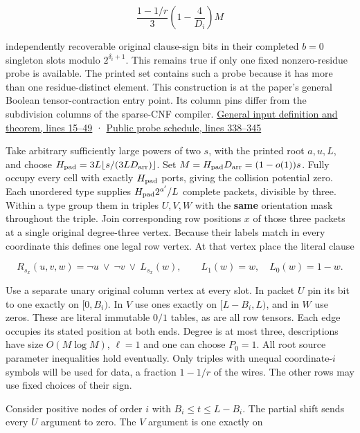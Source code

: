 \documentclass[
  11pt,
]{article}
\begin{document}
\[
       \frac{1-1/r}{3}\left(1-\frac{4}{D_i}\right)M
       \tag{P10}
\]

independently recoverable original clause-sign bits in their completed
\(b=0\) singleton slots modulo \(2^{\delta_i+1}\). This remains true if
only one fixed nonzero-residue probe is available. The printed set
contains such a probe because it has more than one residue-distinct
element. This construction is at the paper's general Boolean
tensor-contraction entry point. Its column pins differ from the
subdivision columns of the sparse-CNF compiler.
\href{https://github.com/openai/math/blob/main/preprints/The-Exponential-Time-Hypothesis-is-False-October-25-2026/build/quantitative-reduction.tex\#L15}{General
input definition and theorem, lines 15--49} ·
\href{https://github.com/openai/math/blob/main/preprints/The-Exponential-Time-Hypothesis-is-False-October-25-2026/build/quantitative-contraction.tex\#L338}{Public
probe schedule, lines 338--345}

Take arbitrary sufficiently large powers of two \(s\), with the printed
root \(a,u,L\), and choose
\(H_{\rm pad}=3L\lfloor s/(3L D_{\rm arr})\rfloor\). Set
\(M=H_{\rm pad}D_{\rm arr}=(1-o(1))s\). Fully occupy every cell with
exactly \(H_{\rm pad}\) ports, giving the collision potential zero. Each
unordered type supplies \(H_{\rm pad}2^{a'}/L\) complete packets,
divisible by three. Within a type group them in triples \(U,V,W\) with
the \textbf{same} orientation mask throughout the triple. Join
corresponding row positions \(x\) of those three packets at a single
original degree-three vertex. Because their labels match in every
coordinate this defines one legal row vertex. At that vertex place the
literal clause

\[
       R_{s_x}(u,v,w)=\neg u\ \lor\ \neg v\ \lor\ L_{s_x}(w),
       \qquad L_1(w)=w,\quad L_0(w)=1-w .
\]

Use a separate unary original column vertex at every slot. In packet
\(U\) pin its bit to one exactly on \([0,B_i)\). In \(V\) use ones
exactly on \([L-B_i,L)\), and in \(W\) use zeros. These are literal
immutable \(0/1\) tables, as are all row tensors. Each edge occupies its
stated position at both ends. Degree is at most three, descriptions have
size \(O(M\log M)\), \(\ell=1\) and one can choose \(P_0=1\). All root
source parameter inequalities hold eventually. Only triples with unequal
coordinate-\(i\) symbols will be used for data, a fraction \(1-1/r\) of
the wires. The other rows may use fixed choices of their sign.

Consider positive nodes of order \(i\) with \(B_i\le t\le L-B_i\). The
partial shift sends every \(U\) argument to zero. The \(V\) argument is
one exactly on
\end{document}
